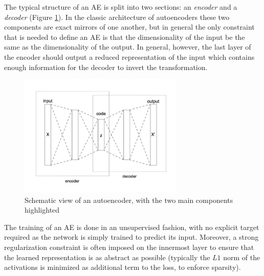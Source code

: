 The typical structure of an AE is split into two sections: an 
\textit{encoder} and a \textit{decoder} (Figure \ref{f:autoencoder}). 
In the classic architecture of autoencoders these two components are exact 
mirrors of one another, but in general the only constraint that is needed to 
define an AE is that the dimensionality of the input be the same as the 
dimensionality of the output.
In general, however, the last layer of the encoder should output a reduced 
representation of the input which contains enough information for the decoder to
invert the transformation.
%
\begin{figure}[h]
\includegraphics[width=0.7\textwidth]{pictures/autoencoder}
\centering
\caption[Schematic view of an autoencoder]{Schematic view of an autoencoder, 
					   with the two main components 
					   highlighted}
\label{f:autoencoder}
\end{figure}
%

The training of an AE is done in an unsupervised fashion, with no
explicit target required as the network is simply trained to predict its input.
Moreover, a strong regularization constraint is often imposed on the innermost 
layer to ensure that the learned representation is as abstract as possible 
(typically the $L1$ norm of the activations is minimized as additional term to
 the loss, to enforce sparsity). 

